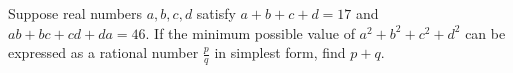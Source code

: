 Suppose real numbers $a, b, c, d$ satisfy $a + b + c + d = 17$ and $ab + bc + cd + da = 46$. If the minimum possible value of $a^2 + b^2 + c^2 + d^2$ can be expressed as a rational number $\frac{p}{q}$ in simplest form, find $p + q$.